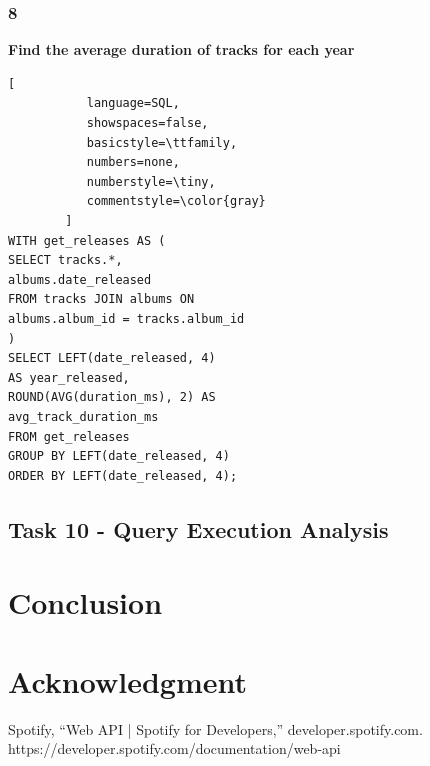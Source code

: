\documentclass[conference]{IEEEtran}
\begin{document}
\subsubsection*{8} \textbf{Find the average duration of tracks for each year}

\begin{lstlisting}[
           language=SQL,
           showspaces=false,
           basicstyle=\ttfamily,
           numbers=none,
           numberstyle=\tiny,
           commentstyle=\color{gray}
        ]
WITH get_releases AS (
SELECT tracks.*,
albums.date_released
FROM tracks JOIN albums ON 
albums.album_id = tracks.album_id
)
SELECT LEFT(date_released, 4) 
AS year_released, 
ROUND(AVG(duration_ms), 2) AS 
avg_track_duration_ms
FROM get_releases
GROUP BY LEFT(date_released, 4)
ORDER BY LEFT(date_released, 4);
\end{lstlisting}

\subsection{\textbf{Task 10} - Query Execution Analysis}

\section{Conclusion}



\section*{Acknowledgment}


\begin{thebibliography}{00}
Spotify, “Web API | Spotify for Developers,” developer.spotify.com. https://developer.spotify.com/documentation/web-api

\end{thebibliography}
\end{document}
